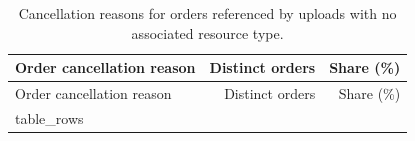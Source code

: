 \begin{longtable}{@{}lrr@{}}
\caption{Cancellation reasons for orders referenced by uploads with no associated resource type.}
\label{tab:null-resource-upload-order-cancel-reasons}\\
\toprule
Order cancellation reason & Distinct orders & Share (\%) \\
\midrule
\endfirsthead
\toprule
Order cancellation reason & Distinct orders & Share (\%) \\
\midrule
\endhead
{{ table_rows }}
\bottomrule
\end{longtable}
